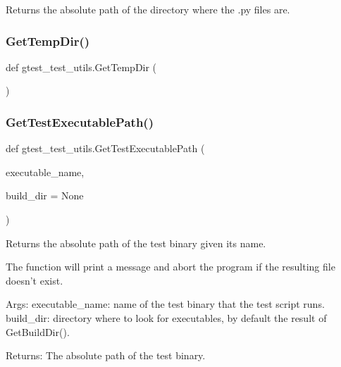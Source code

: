 \begin{DoxyVerb}Returns the absolute path of the directory where the .py files are.\end{DoxyVerb}
 \mbox{\label{namespacegtest__test__utils_a25987e1cd76e93068b2afe6bac909d12}} 
\subsubsection{\texorpdfstring{GetTempDir()}{GetTempDir()}}
{\footnotesize\ttfamily def gtest\+\_\+test\+\_\+utils.\+Get\+Temp\+Dir (\begin{DoxyParamCaption}{ }\end{DoxyParamCaption})}

\mbox{\label{namespacegtest__test__utils_a89ed3717984a80ffbb7a9c92f71b86a2}} 
\subsubsection{\texorpdfstring{GetTestExecutablePath()}{GetTestExecutablePath()}}
{\footnotesize\ttfamily def gtest\+\_\+test\+\_\+utils.\+Get\+Test\+Executable\+Path (\begin{DoxyParamCaption}\item[{}]{executable\+\_\+name,  }\item[{}]{build\+\_\+dir = {\ttfamily None} }\end{DoxyParamCaption})}

\begin{DoxyVerb}Returns the absolute path of the test binary given its name.

The function will print a message and abort the program if the resulting file
doesn't exist.

Args:
  executable_name: name of the test binary that the test script runs.
  build_dir:       directory where to look for executables, by default
                   the result of GetBuildDir().

Returns:
  The absolute path of the test binary.
\end{DoxyVerb}
 \mbox{\label{namespacegtest__test__utils_a5361b42d9c6843b5b117ead4d1c58cc5}} 
